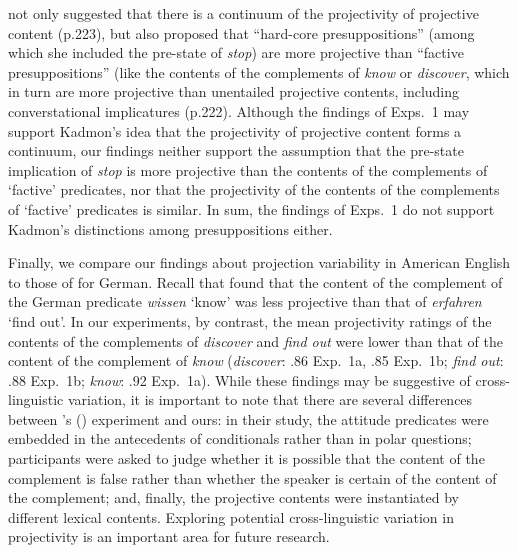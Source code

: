 \documentclass[11pt,fleqn]{article}
\newcommand{\6}{\mbox{$[\hspace*{-.6mm}[$}}
\newcommand{\9}{\mbox{$]\hspace*{-.6mm}]$}}
\newcommand{\citetpos}[1]{\citeauthor{#1}'s (\citeyear{#1})}
\begin{document}
\citet{kadmon01} not only suggested that there is a continuum of the projectivity of projective content (p.223), but also proposed that ``hard-core presuppositions'' (among which she included the pre-state of {\em stop}) are more projective than ``factive presuppositions'' (like the contents of the complements of {\em know} or {\em discover}, which in turn are more projective than unentailed projective contents, including converstational implicatures (p.222). Although the findings of Exps.~1 may support Kadmon's idea that the projectivity of projective content forms a continuum, our findings neither support the assumption that the pre-state implication of {\em stop} is more projective than the contents of the complements of `factive' predicates, nor that the projectivity of the contents of the complements of `factive' predicates is similar. In sum, the findings of Exps.~1 do not support Kadmon's distinctions among presuppositions either.

Finally, we compare our findings about projection variability in American English to those of \citealt{xue-onea11} for German. Recall that \citet{xue-onea11} found that the content of the complement of the German predicate {\em wissen} `know' was less projective than that of {\em erfahren} `find out'. In our experiments, by contrast, the mean projectivity ratings of the contents of the complements of {\em discover} and {\em find out} were lower  than that of the content of the complement of {\em know} ({\em discover}: .86 Exp.~1a, .85 Exp.~1b; {\em find out}: .88 Exp.~1b; {\em know}: .92 Exp.~1a). While these findings may be suggestive of cross-linguistic variation, it is important to note that there are several differences between \citetpos{xue-onea11} experiment and ours: in their study, the attitude predicates were embedded in the antecedents of conditionals rather than in polar questions; participants were asked to judge whether it is possible that the content of the complement is false rather than whether the speaker is certain of the content of the complement; and, finally, the projective contents were instantiated by different lexical contents. Exploring potential cross-linguistic variation in projectivity is an important area for future research.
\end{document}

